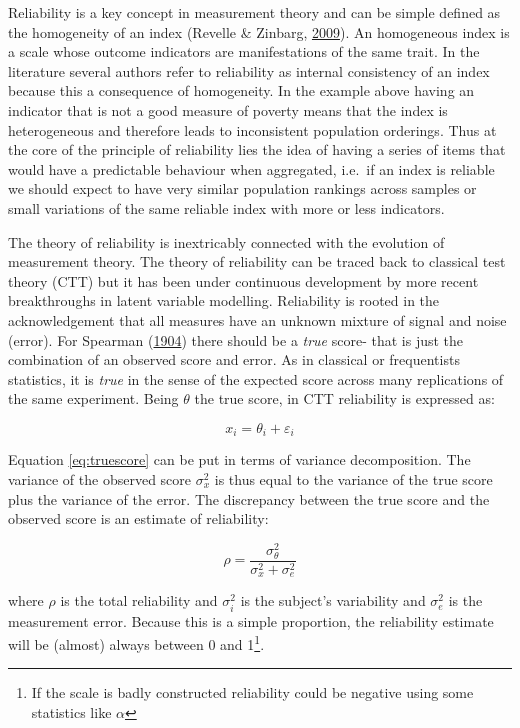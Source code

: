 \documentclass[]{book}
\let\rmarkdownfootnote\footnote%
\def\footnote{\protect\rmarkdownfootnote}
\begin{document}
Reliability is a key concept in measurement theory and can be simple defined as the homogeneity of an index (Revelle \& Zinbarg, \protect\hyperlink{ref-Revelle2009}{2009}). An homogeneous index is a scale whose outcome indicators are manifestations of the same trait. In the literature several authors refer to reliability as internal consistency of an index because this a consequence of homogeneity. In the example above having an indicator that is not a good measure of poverty means that the index is heterogeneous and therefore leads to inconsistent population orderings. Thus at the core of the principle of reliability lies the idea of having a series of items that would have a predictable behaviour when aggregated, i.e.~if an index is reliable we should expect to have very similar population rankings across samples or small variations of the same reliable index with more or less indicators.

The theory of reliability is inextricably connected with the evolution of measurement theory. The theory of reliability can be traced back to classical test theory (CTT) but it has been under continuous development by more recent breakthroughs in latent variable modelling. Reliability is rooted in the acknowledgement that all measures have an unknown mixture of signal and noise (error). For Spearman (\protect\hyperlink{ref-Spearman1904}{1904}) there should be a \emph{true} score- that is just the combination of an observed score and error. As in classical or frequentists statistics, it is \emph{true} in the sense of the expected score across many replications of the same experiment. Being \(\theta\) the true score, in CTT reliability is expressed as:

\begin{equation}
\label{eq:truescore}
x_i = \theta_i + \varepsilon_i
\end{equation}

Equation \eqref{eq:truescore} can be put in terms of variance decomposition. The variance of the observed score \(\sigma^{2}_{x}\) is thus equal to the variance of the true score plus the variance of the error. The discrepancy between the true score and the observed score is an estimate of reliability:

\begin{equation}
\label{eq:reliability1}
  \rho =  \frac{\sigma^{2}_{\theta}} {\sigma^{2}_{x} + \sigma^{2}_{e}}
\end{equation}

where \(\rho\) is the total reliability and \(\sigma^{2}_{i}\) is the subject's variability and \(\sigma^{2}_{e}\) is the measurement error. Because this is a simple proportion, the reliability estimate will be (almost) always between 0 and 1\footnote{If the scale is badly constructed reliability could be negative using some statistics like \(\alpha\)}.
\end{document}
